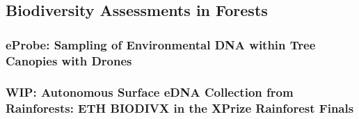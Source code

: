\subsection{Biodiversity Assessments in Forests}

\subsubsection{eProbe: Sampling of Environmental DNA within Tree Canopies with Drones \cite{Kirchgeorg2024}}

\subsubsection{WIP: Autonomous Surface eDNA Collection from Rainforests: ETH BIODIVX in the XPrize Rainforest Finals}



